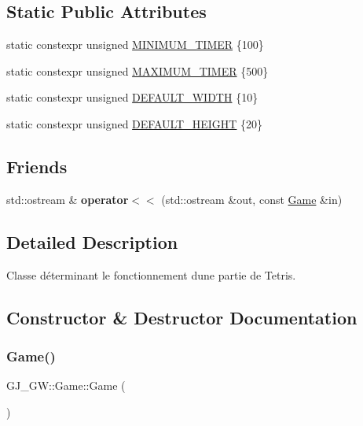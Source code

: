 \subsection*{Static Public Attributes}
\begin{DoxyCompactItemize}
\item 
static constexpr unsigned \hyperlink{class_g_j___g_w_1_1_game_a4f6cc808814a6884659f89dae6a7b150}{M\+I\+N\+I\+M\+U\+M\+\_\+\+T\+I\+M\+ER} \{100\}
\item 
static constexpr unsigned \hyperlink{class_g_j___g_w_1_1_game_a32cb03f34e9e7a56ff3d99e075d71de7}{M\+A\+X\+I\+M\+U\+M\+\_\+\+T\+I\+M\+ER} \{500\}
\item 
static constexpr unsigned \hyperlink{class_g_j___g_w_1_1_game_aad3519451b28b2fc51529176a66a43c8}{D\+E\+F\+A\+U\+L\+T\+\_\+\+W\+I\+D\+TH} \{10\}
\item 
static constexpr unsigned \hyperlink{class_g_j___g_w_1_1_game_a40391b842c9a4238cf1f5ed93e8046c2}{D\+E\+F\+A\+U\+L\+T\+\_\+\+H\+E\+I\+G\+HT} \{20\}
\end{DoxyCompactItemize}
\subsection*{Friends}
\begin{DoxyCompactItemize}
\item 
\hypertarget{class_g_j___g_w_1_1_game_abacede938294fd797bbefe49cb3f6978}{}\label{class_g_j___g_w_1_1_game_abacede938294fd797bbefe49cb3f6978} 
std\+::ostream \& {\bfseries operator$<$$<$} (std\+::ostream \&out, const \hyperlink{class_g_j___g_w_1_1_game}{Game} \&in)
\end{DoxyCompactItemize}


\subsection{Detailed Description}
Classe déterminant le fonctionnement d\textquotesingle{}une partie de Tetris. 

\subsection{Constructor \& Destructor Documentation}
\hypertarget{class_g_j___g_w_1_1_game_acabf662fb6929976e25cf29006f665c0}{}\label{class_g_j___g_w_1_1_game_acabf662fb6929976e25cf29006f665c0} 
\subsubsection{\texorpdfstring{Game()}{Game()}}
{\footnotesize\ttfamily G\+J\+\_\+\+G\+W\+::\+Game\+::\+Game (\begin{DoxyParamCaption}{ }\end{DoxyParamCaption})}



